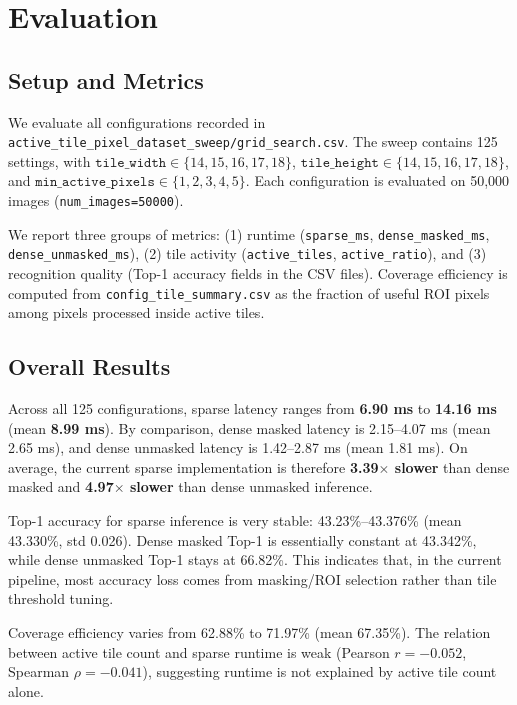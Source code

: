 \section{Evaluation}
\label{sec:evaluation}

\subsection{Setup and Metrics}
We evaluate all configurations recorded in \texttt{active\_tile\_pixel\_dataset\_sweep/grid\_search.csv}. The sweep contains 125 settings, with
$\texttt{tile\_width} \in \{14,15,16,17,18\}$,
$\texttt{tile\_height} \in \{14,15,16,17,18\}$, and
$\texttt{min\_active\_pixels} \in \{1,2,3,4,5\}$.
Each configuration is evaluated on 50{,}000 images (\texttt{num\_images=50000}).

We report three groups of metrics:
(1) runtime (\texttt{sparse\_ms}, \texttt{dense\_masked\_ms}, \texttt{dense\_unmasked\_ms}),
(2) tile activity (\texttt{active\_tiles}, \texttt{active\_ratio}), and
(3) recognition quality (Top-1 accuracy fields in the CSV files).
Coverage efficiency is computed from \texttt{config\_tile\_summary.csv} as the fraction of useful ROI pixels among pixels processed inside active tiles.

\subsection{Overall Results}
Across all 125 configurations, sparse latency ranges from \textbf{6.90 ms} to \textbf{14.16 ms} (mean \textbf{8.99 ms}).
By comparison, dense masked latency is 2.15--4.07 ms (mean 2.65 ms), and dense unmasked latency is 1.42--2.87 ms (mean 1.81 ms).
On average, the current sparse implementation is therefore \textbf{3.39$\times$ slower} than dense masked and \textbf{4.97$\times$ slower} than dense unmasked inference.

Top-1 accuracy for sparse inference is very stable: 43.23\%--43.376\% (mean 43.330\%, std 0.026).
Dense masked Top-1 is essentially constant at 43.342\%, while dense unmasked Top-1 stays at 66.82\%.
This indicates that, in the current pipeline, most accuracy loss comes from masking/ROI selection rather than tile threshold tuning.

Coverage efficiency varies from 62.88\% to 71.97\% (mean 67.35\%).
The relation between active tile count and sparse runtime is weak (Pearson $r=-0.052$, Spearman $\rho=-0.041$), suggesting runtime is not explained by active tile count alone.

